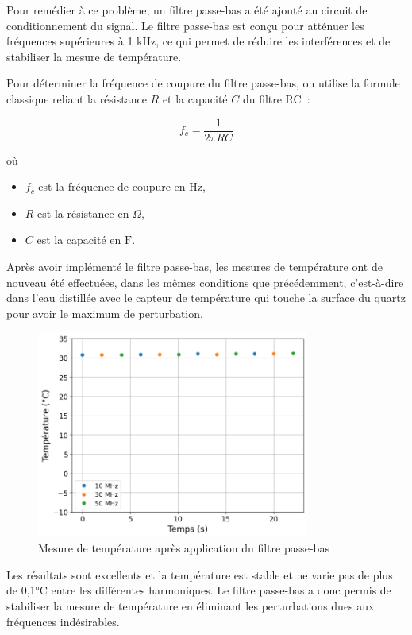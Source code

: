 Pour remédier à ce problème, un filtre passe-bas a été ajouté au circuit de conditionnement du signal.
Le filtre passe-bas est conçu pour atténuer les fréquences supérieures à 1 kHz, ce qui permet de réduire les interférences et de stabiliser la mesure de température.

Pour déterminer la fréquence de coupure du filtre passe-bas, on utilise la formule classique reliant la résistance $R$ et la capacité $C$ du filtre RC :

\begin{equation}
f_c = \frac{1}{2\pi RC}
\label{eq:frequence_coupure}
\end{equation}

où
\begin{itemize}
    \item $f_c$ est la fréquence de coupure en Hz,
    \item $R$ est la résistance en $\Omega$,
    \item $C$ est la capacité en $\mathrm{F}$.
\end{itemize}

Après avoir implémenté le filtre passe-bas, les mesures de température ont de nouveau été effectuées, dans les mêmes conditions que précédemment, c'est-à-dire dans l'eau distillée avec le capteur de température qui touche la surface du quartz pour avoir le maximum de perturbation.

\begin{figure}[H]
    \centering
    \includegraphics[width=0.8\textwidth]{assets/figures/TempFiltered.png}
    \caption{Mesure de température après application du filtre passe-bas}
    \label{fig:TempBruitFiltre}
\end{figure}

Les résultats sont excellents et la température est stable et ne varie pas de plus de 0,1°C entre les différentes harmoniques.
Le filtre passe-bas a donc permis de stabiliser la mesure de température en éliminant les perturbations dues aux fréquences indésirables.

